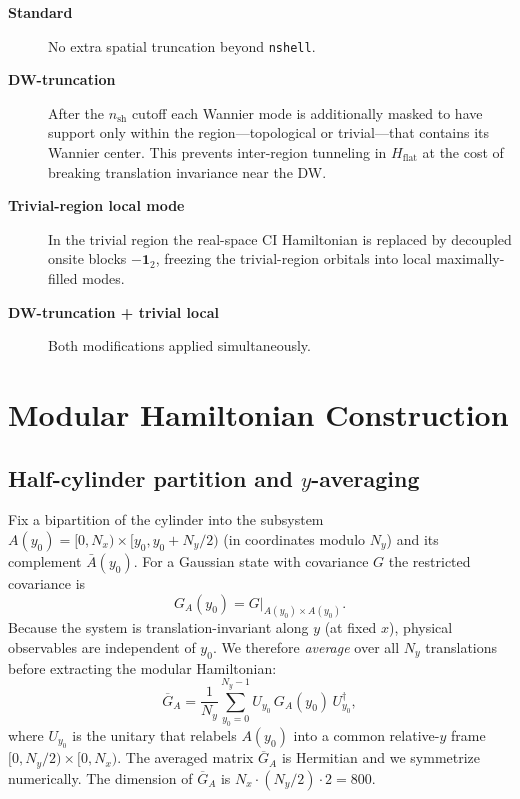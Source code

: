 \documentclass[aps,prb,twocolumn,superscriptaddress,floatfix]{revtex4-2}
\newcommand{\Nx}{N_x}
\newcommand{\Ny}{N_y}
\newcommand{\Hflat}{H_{\mathrm{flat}}}
\begin{document}
\begin{description}
  \item[\textbf{Standard}] No extra spatial truncation beyond \texttt{nshell}.
  \item[\textbf{DW-truncation}]  After the $n_\mathrm{sh}$ cutoff each
    Wannier mode is additionally masked to have support only within the
    region—topological or trivial—that contains its Wannier center.  This
    prevents inter-region tunneling in $\Hflat$ at the cost of breaking
    translation invariance near the DW.
  \item[\textbf{Trivial-region local mode}]  In the trivial region the
    real-space CI Hamiltonian is replaced by decoupled onsite blocks $-\mathbf{1}_2$,
    freezing the trivial-region orbitals into local maximally-filled modes.
  \item[\textbf{DW-truncation + trivial local}]  Both modifications applied
    simultaneously.
\end{description}

\section{Modular Hamiltonian Construction}
\label{sec:modular}

\subsection{Half-cylinder partition and $y$-averaging}

Fix a bipartition of the cylinder into the subsystem
$A(y_0) = [0, \Nx) \times [y_0, y_0 + \Ny/2)$ (in coordinates modulo $\Ny$)
and its complement $\bar{A}(y_0)$.  For a Gaussian state with covariance $G$
the restricted covariance is
\begin{equation}
  G_A(y_0) = G\big|_{A(y_0) \times A(y_0)}.
\end{equation}
Because the system is translation-invariant along $y$ (at fixed $x$),
physical observables are independent of $y_0$.  We therefore
\emph{average} over all $\Ny$ translations before extracting the modular
Hamiltonian:
\begin{equation}
  \overline{G}_A = \frac{1}{\Ny} \sum_{y_0=0}^{\Ny-1}
      U_{y_0}\, G_A(y_0)\, U_{y_0}^\dagger,
  \label{eq:Gavg}
\end{equation}
where $U_{y_0}$ is the unitary that relabels $A(y_0)$ into a common relative-$y$
frame $[0,\Ny/2) \times [0,\Nx)$.  The averaged matrix $\overline{G}_A$ is
Hermitian and we symmetrize numerically.  The dimension of $\overline{G}_A$ is
$\Nx \cdot (\Ny/2) \cdot 2 = 800$.
\end{document}
